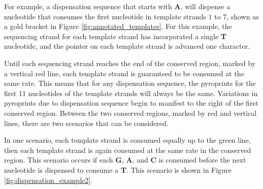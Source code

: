 \documentclass[12pt]{ucthesis}
\begin{document}
      For example, a dispensation sequence that starts with \textbf{A}, will
      dispense a nucleotide that consumes the first nucleotide in template
      strands $1$ to $7$, shown as a gold bracket in Figure
      \ref{fig:annotated_templates}. For this example, the sequencing strand
      for each template strand has incorporated a single \textbf{T} nucleotide,
      and the pointer on each template strand is advanced one character.

      Until each sequencing strand reaches the end of the conserved region,
      marked by a vertical red line, each template strand is
      guaranteed to be consumed at the same rate. This means that for any
      dispensation sequence, the pyroprints for the first 11 nucleotides of
      the template strands will always be the same. Variations in pyroprints
      due to dispensation sequence begin to manifest to the right of the first
      conserved region. Between the two conserved regions, marked by red and
      vertical lines, there are two scenarios that can be considered.

      In one scenario, each template strand is consumed equally up to the green
      line, then each template strand is again consumed at the same rate in the
      conserved region. This scenario occurs if each \textbf{G}, \textbf{A},
      and \textbf{C} is consumed before the next nucleotide is dispensed to
      consume a \textbf{T}. This scenario is shown in Figure
      \ref{fig:dispensation_example2}.
\end{document}
